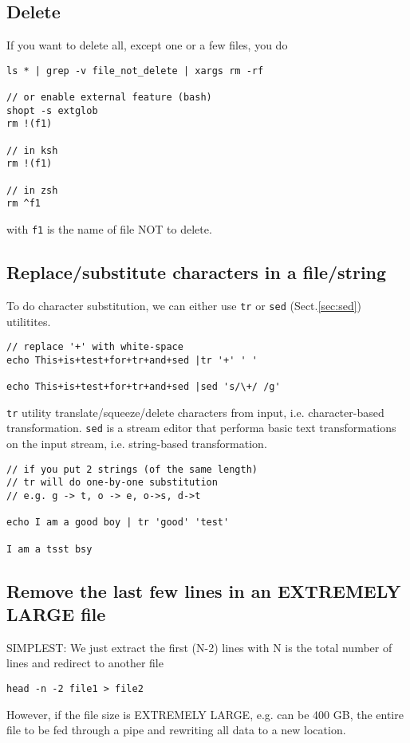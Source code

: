 \subsection{Delete}

If you want to delete all, except one or a few files, you do
\begin{verbatim}
ls * | grep -v file_not_delete | xargs rm -rf

// or enable external feature (bash)
shopt -s extglob
rm !(f1)

// in ksh
rm !(f1)

// in zsh
rm ^f1
\end{verbatim}
with \verb!f1! is the name of file NOT to delete.

\subsection{Replace/substitute characters in a file/string}

To do character substitution, we can either use \verb!tr! or \verb!sed!
(Sect.\ref{sec:sed}) utilitites.
\begin{verbatim}
// replace '+' with white-space
echo This+is+test+for+tr+and+sed |tr '+' ' '

echo This+is+test+for+tr+and+sed |sed 's/\+/ /g'
\end{verbatim}

\verb!tr! utility translate/squeeze/delete characters from input, i.e.
character-based transformation.
\verb!sed! is a stream editor that performa basic text transformations on the
input stream, i.e. string-based transformation.

\begin{verbatim}
// if you put 2 strings (of the same length)
// tr will do one-by-one substitution
// e.g. g -> t, o -> e, o->s, d->t

echo I am a good boy | tr 'good' 'test'

I am a tsst bsy
\end{verbatim}



\subsection{Remove the last few lines in an EXTREMELY LARGE file}

SIMPLEST: We just extract the first (N-2) lines with N is the
total number of lines and redirect to another file
\begin{verbatim}
head -n -2 file1 > file2
\end{verbatim}
However, if the file size is EXTREMELY LARGE, e.g. can be 400 GB, the entire
file to be fed through a pipe and rewriting all data to a new location.

